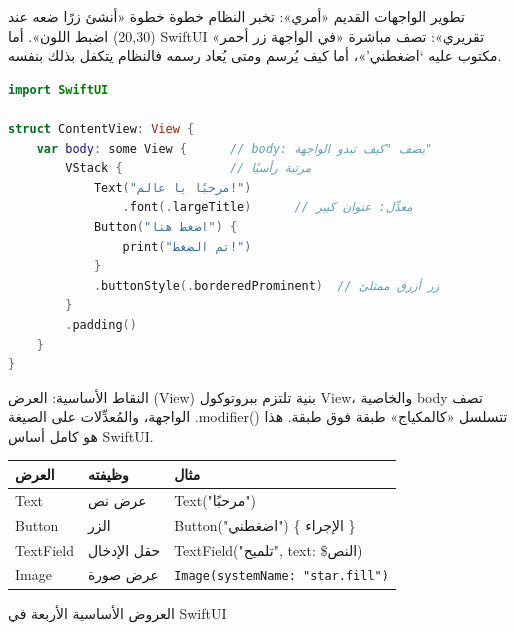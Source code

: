 


تطوير الواجهات القديم «أمري»: تخبر النظام خطوة خطوة «أنشئ زرًا ضعه عند (20,30) اضبط اللون». أما SwiftUI «تقريري»: تصف مباشرة «في الواجهة زر أحمر مكتوب عليه ‘اضغطني’»، أما كيف يُرسم ومتى يُعاد رسمه فالنظام يتكفل بذلك بنفسه.

\begin{lstlisting}[language=Swift]
import SwiftUI

struct ContentView: View {
    var body: some View {      // body: يصف "كيف تبدو الواجهة"
        VStack {               // مرتبة رأسيًا
            Text("مرحبًا يا عالم!")
                .font(.largeTitle)      // معدِّل: عنوان كبير
            Button("اضغط هنا") {
                print("تم الضغط!")
            }
            .buttonStyle(.borderedProminent)  // زر أزرق ممتلئ
        }
        .padding()
    }
}
\end{lstlisting}

النقاط الأساسية: العرض (View) بنية تلتزم ببروتوكول View، والخاصية body تصف الواجهة، والمُعدِّلات على الصيغة .modifier() تتسلسل «كالمكياج» طبقة فوق طبقة. هذا هو كامل أساس SwiftUI.


\begin{center}
\begin{tabularx}{\linewidth}{|X|X|X|}
\hline
\textbf{العرض} & \textbf{وظيفته} & \textbf{مثال} \tabularnewline
\hline
Text & عرض نص & Text("مرحبًا") \tabularnewline
Button & الزر & Button("اضغطني") \{ الإجراء \} \tabularnewline
TextField & حقل الإدخال & TextField("تلميح", text: \$النص) \tabularnewline
Image & عرض صورة & \texttt{Image(systemName: "star.\allowbreak fill")} \tabularnewline
\hline
\end{tabularx}
\end{center}

\begin{center}\small\color{gray}العروض الأساسية الأربعة في SwiftUI\end{center}

